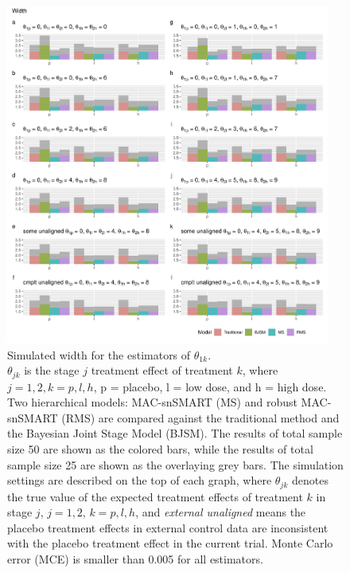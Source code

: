 \begin{figure}
\includegraphics[width=0.95\textwidth]{chapters/figures/Width.pdf}
\caption{Simulated width for the estimators of $\theta_{1k}$. \\ $\theta_{jk}$ is the stage $j$ treatment effect of treatment $k$, where $j = 1,2, k = p, l, h$, p = placebo, l = low dose, and h = high dose. Two hierarchical models: MAC-snSMART (MS) and robust MAC-snSMART (RMS) are compared against the traditional method and the Bayesian Joint Stage Model (BJSM). The results of total sample size 50 are shown as the colored bars, while the results of total sample size 25 are shown as the overlaying grey bars. The simulation settings are described on the top of each graph, where $\theta_{jk}$ denotes the true value of the expected treatment effects of treatment $k$ in stage $j$, $j = 1, 2$, $k = p, l, h$, and \emph{external unaligned} means the placebo treatment effects in external control data are inconsistent with the placebo treatment effect in the current trial. Monte Carlo error (MCE) is smaller than 0.005 for all estimators.}
\label{fig:Width}
\end{figure}

\newpage


